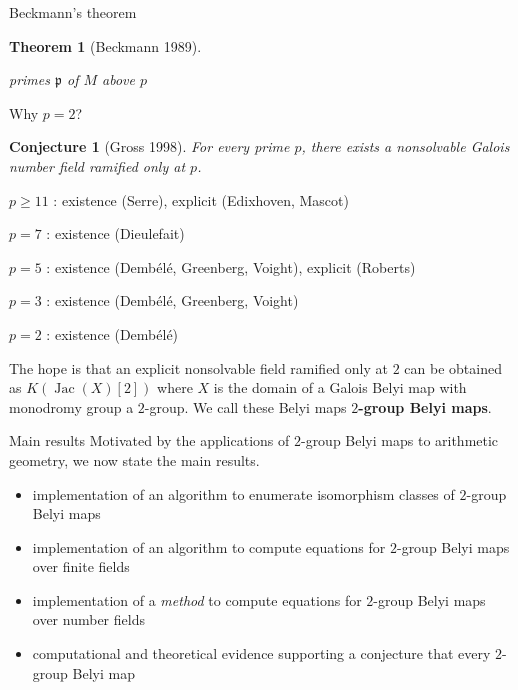\documentclass[xcolor=dvipsnames,handout]{beamer}
\theoremstyle{plain}
\newtheorem*{thm}{Theorem}
\newtheorem*{conj}{Conjecture}
\DeclareMathOperator{\Jac}{Jac}
\begin{document}
{\begin{frame}{Beckmann's theorem}
\begin{thm}[Beckmann 1989]
\begin{itemize}
            primes $\mathfrak{p}$ of $M$
            above $p$
        \end{itemize}
      \end{thm}
    \end{frame}
    \begin{frame}{Why $p=2$?}
      \begin{conj}[Gross 1998]
        \vspace{1pt}
        For every prime $p$,
        there exists a nonsolvable Galois number field
        ramified only at $p$.
      \end{conj}
      \pause
      $p\geq 11$ : existence (Serre), explicit (Edixhoven, Mascot)
      \par
      $p=7$ : existence (Dieulefait)
      \par
      $p=5$ : existence (Demb\'{e}l\'{e}, Greenberg, Voight), explicit (Roberts)
      \par
      $p=3$ : existence (Demb\'{e}l\'{e}, Greenberg, Voight)
      \par
      $p=2$ : existence (Demb\'{e}l\'{e})
      \pause
      \par
      The hope is that an explicit nonsolvable field ramified only at $2$
      can be obtained as $K(\Jac(X)[2])$ where
      $X$ is the domain of a Galois Belyi map
      with monodromy group a $2$-group.
      \pause\newline
      We call these Belyi maps
      \textbf{$2$-group Belyi maps}.
    \end{frame}
    \begin{frame}{Main results}
      Motivated by the applications of
      $2$-group Belyi maps to arithmetic geometry,
      we now state the main results.
      \pause
      \begin{itemize}
        \item
          implementation of an algorithm to
          enumerate isomorphism classes
          of $2$-group Belyi maps
          \pause
        \item
          implementation of an algorithm to
          compute equations for
          $2$-group Belyi maps
          over finite fields
          \pause
        \item
          implementation of a \emph{method}
          to compute equations for
          $2$-group Belyi maps
          over number fields
          \pause
        \item
          computational and theoretical evidence
          supporting a conjecture that
          every $2$-group Belyi map

\end{itemize}
\end{frame}}
\end{document}

